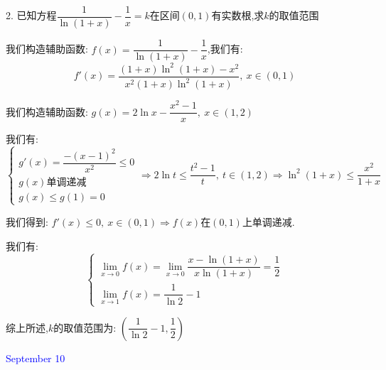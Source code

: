 2. 已知方程$\dfrac{1}{\ln(1+x)}-\dfrac{1}{x}=k$在区间$(0,1)$有实数根,求$k$的取值范围
\begin{solution}

	我们构造辅助函数:  $f(x)=\dfrac{1}{\ln(1+x)}-\dfrac{1}{x}$,我们有:  
	$$f'(x)=\dfrac{(1+x)\ln^2(1+x)-x^2}{x^2(1+x)\ln^2(1+x)},\ x\in(0,1)$$
	
	我们构造辅助函数:  $g(x)=2\ln x-\dfrac{x^2-1}{x},\ x\in(1,2)$
	
	我们有:  
	$$\left\lbrace
	\begin{array}{l}
		g'(x)=\dfrac{-(x-1)^2}{x^2}\leq 0\\
		g(x)\text{单调递减}\\
		g(x)\leq g(1)=0
	\end{array}
	\right. \Rightarrow 2\ln t\leq \dfrac{t^2-1}{t},\ t\in(1,2)\Rightarrow \ln^2(1+x)\leq \dfrac{x^2}{1+x}$$
	
	我们得到:  $f'(x)\leq 0,\ x\in(0,1)\Rightarrow f(x)$在$(0,1)$上单调递减.
	
	我们有:  $$\left\lbrace
	\begin{array}{l}
		\lim\limits_{x\to 0}f(x)=\lim\limits_{x\to 0}\dfrac{x-\ln(1+x)}{x\ln(1+x)}=\dfrac{1}{2}\\
		\lim\limits_{x\to 1}f(x)=\dfrac{1}{\ln 2}-1
	\end{array}
	\right. $$
	
	综上所述,$k$的取值范围为:  $(\dfrac{1}{\ln2}-1,\dfrac{1}{2})$
\end{solution}

\textcolor{blue}{September 10}


